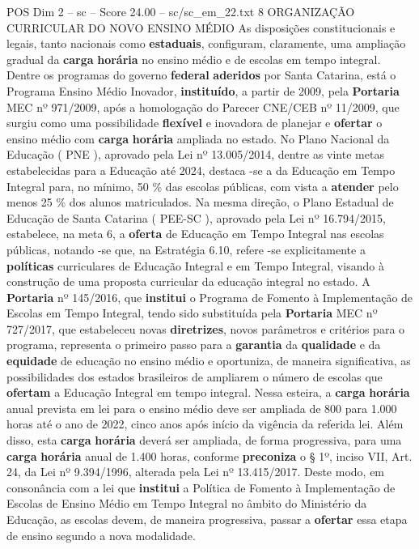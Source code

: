 \begin{textsample}{POS Dim 2 – sc – Score 24.00 – sc/sc\_em\_22.txt}  \label{ex:f2_pos_008}
8 ORGANIZAÇÃO CURRICULAR DO NOVO ENSINO MÉDIO As disposições constitucionais e legais, tanto nacionais como \textbf{estaduais}, configuram, claramente, uma ampliação gradual da \textbf{carga} \textbf{horária} no ensino médio e de escolas em tempo integral.
Dentre os programas do governo \textbf{federal} \textbf{aderidos} por Santa Catarina, está o Programa Ensino Médio Inovador, \textbf{instituído}, a partir de 2009, pela \textbf{Portaria} MEC nº 971/2009, após a homologação do Parecer CNE/CEB nº 11/2009, que surgiu como uma possibilidade \textbf{flexível} e inovadora de planejar e \textbf{ofertar} o ensino médio com \textbf{carga} \textbf{horária} ampliada no estado.
No Plano Nacional da Educação ( PNE ), aprovado pela Lei nº 13.005/2014, dentre as vinte metas estabelecidas para a Educação até 2024, destaca -se a da Educação em Tempo Integral para, no mínimo, 50 \% das escolas públicas, com vista a \textbf{atender} pelo menos 25 \% dos alunos matriculados.
Na mesma direção, o Plano Estadual de Educação de Santa Catarina ( PEE-SC ), aprovado pela Lei nº 16.794/2015, estabelece, na meta 6, a \textbf{oferta} de Educação em Tempo Integral nas escolas públicas, notando -se que, na Estratégia 6.10, refere -se explicitamente a \textbf{políticas} curriculares de Educação Integral e em Tempo Integral, visando à construção de uma proposta curricular da educação integral no estado.
A \textbf{Portaria} nº 145/2016, que \textbf{institui} o Programa de Fomento à Implementação de Escolas em Tempo Integral, tendo sido substituída pela \textbf{Portaria} MEC nº 727/2017, que estabeleceu novas \textbf{diretrizes}, novos parâmetros e critérios para o programa, representa o primeiro passo para a \textbf{garantia} da \textbf{qualidade} e da \textbf{equidade} de educação no ensino médio e oportuniza, de maneira significativa, as possibilidades dos estados brasileiros de ampliarem o número de escolas que \textbf{ofertam} a Educação Integral em tempo integral.
Nessa esteira, a \textbf{carga} \textbf{horária} anual prevista em lei para o ensino médio deve ser ampliada de 800 para 1.000 horas até o ano de 2022, cinco anos após início da vigência da referida lei.
Além disso, esta \textbf{carga} \textbf{horária} deverá ser ampliada, de forma progressiva, para uma \textbf{carga} \textbf{horária} anual de 1.400 horas, conforme \textbf{preconiza} o § 1º, inciso VII, Art. 24, da Lei nº 9.394/1996, alterada pela Lei nº 13.415/2017.
Deste modo, em consonância com a lei que \textbf{institui} a Política de Fomento à Implementação de Escolas de Ensino Médio em Tempo Integral no âmbito do Ministério da Educação, as escolas devem, de maneira progressiva, passar a \textbf{ofertar} essa etapa de ensino segundo a nova modalidade.

\end{textsample}
